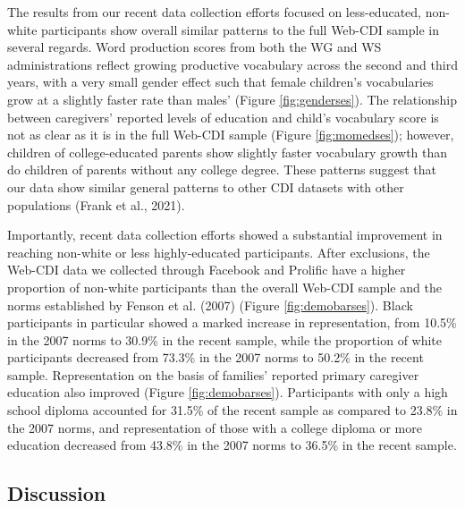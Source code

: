 \documentclass[
  english,
  ,man,floatsintext]{apa6}
\begin{document}
The results from our recent data collection efforts focused on less-educated, non-white participants show overall similar patterns to the full Web-CDI sample in several regards. Word production scores from both the WG and WS administrations reflect growing productive vocabulary across the second and third years, with a very small gender effect such that female children's vocabularies grow at a slightly faster rate than males' (Figure \ref{fig:genderses}). The relationship between caregivers' reported levels of education and child's vocabulary score is not as clear as it is in the full Web-CDI sample (Figure \ref{fig:momedses}); however, children of college-educated parents show slightly faster vocabulary growth than do children of parents without any college degree. These patterns suggest that our data show similar general patterns to other CDI datasets with other populations (Frank et al., 2021).

Importantly, recent data collection efforts showed a substantial improvement in reaching non-white or less highly-educated participants. After exclusions, the Web-CDI data we collected through Facebook and Prolific have a higher proportion of non-white participants than the overall Web-CDI sample and the norms established by Fenson et al. (2007) (Figure \ref{fig:demobarses}). Black participants in particular showed a marked increase in representation, from 10.5\% in the 2007 norms to 30.9\% in the recent sample, while the proportion of white participants decreased from 73.3\% in the 2007 norms to 50.2\% in the recent sample. Representation on the basis of families' reported primary caregiver education also improved (Figure \ref{fig:demobarses}). Participants with only a high school diploma accounted for 31.5\% of the recent sample as compared to 23.8\% in the 2007 norms, and representation of those with a college diploma or more education decreased from 43.8\% in the 2007 norms to 36.5\% in the recent sample.

\hypertarget{discussion}{%
\subsection{Discussion}\label{discussion}}
\end{document}
